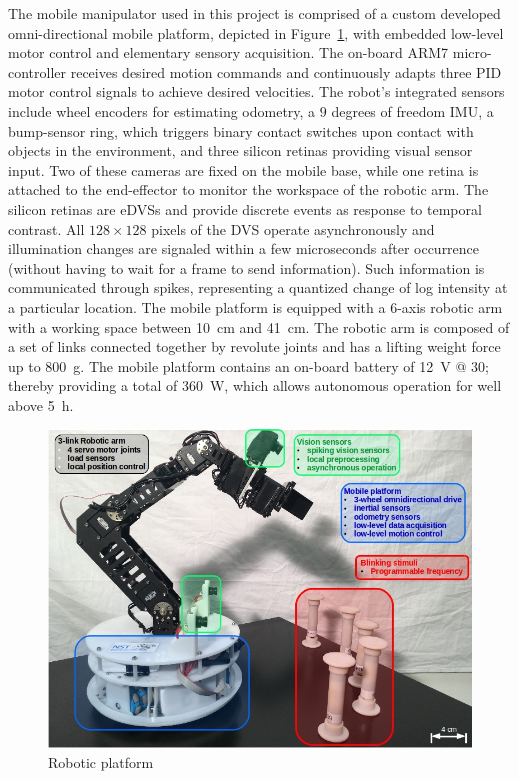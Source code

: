 The mobile manipulator used in this project is comprised of a custom developed omni-directional mobile platform, depicted in Figure~\ref{fig:omniarmbot}, with embedded low-level motor control and elementary sensory acquisition. 
The on-board ARM7 micro-controller receives desired motion commands and continuously adapts three \ac{PID} motor control signals to achieve desired velocities. 
The robot's integrated sensors include wheel encoders for estimating odometry, a $9$ degrees of freedom \ac{IMU}, a bump-sensor ring, which triggers binary contact switches upon contact with objects in the environment, and three silicon retinas providing visual sensor input. 
Two of these cameras are fixed on the mobile base, while one retina is attached to the end-effector to monitor the workspace of the robotic arm. 
The silicon retinas are \acp{eDVS} and provide discrete events as response to temporal contrast. 
All $128 \times 128$ pixels of the \ac{DVS} operate asynchronously and illumination changes are signaled within a few microseconds after occurrence (without having to wait for a frame to send information). 
Such information is communicated through spikes, representing a quantized change of log intensity at a particular location. 
The mobile platform is equipped with a $6$-axis robotic arm with a working space between \SI{10}{\centi\metre} and \SI{41}{\centi\metre}. 
The robotic arm is composed of a set of links connected together by revolute joints and has a lifting weight force up to \SI{800}{\gram}. 
The mobile platform contains an on-board battery of \SI{12}{\volt} @ \SI{30}{\amperehour}; thereby providing a total of \SI{360}{\watt}, which allows autonomous operation for well above \SI{5}{\hour}.

\begin{figure}[t]
    \centering
    \includegraphics[width=0.8\linewidth]{imgs/omniarmbot.png}
    \caption{Robotic platform}
    \label{fig:omniarmbot}
\end{figure}

